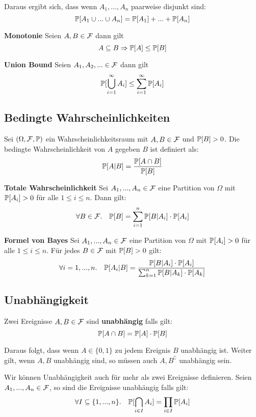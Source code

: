 Daraus ergibt sich, dass wenn $A_1, ..., A_n$ paarweise disjunkt sind: 
$$\mathbb{P}[A_1 \cup ... \cup A_n] = \mathbb{P}[A_1] + ... + \mathbb{P}[A_n]$$

\begin{mainbox}{\textbf{Monotonie}}
Seien $A, B \in \mathcal{F}$ dann gilt 
$$A \subseteq B \Rightarrow \mathbb{P}[A] \leq \mathbb{P}[B]$$
\end{mainbox}

\begin{mainbox}{\textbf{Union Bound}} Seien $A_1, A_2, ... \in \mathcal{F}$ dann gilt 
$$\mathbb{P}[\bigcup_{i = 1}^\infty A_i] \leq \sum_{i = 1}^\infty \mathbb{P}[A_i]$$
\end{mainbox}


\subsection{Bedingte Wahrscheinlichkeiten}

Sei $(\Omega, \mathcal{F}, \mathbb{P})$ ein Wahrscheinlichkeitsraum mit $A, B \in \mathcal{F}$ und $\mathbb{P}[B] > 0$. Die bedingte Wahrscheinlichkeit von $A$ gegeben $B$ ist definiert als:
$$\mathbb{P}[A | B] = \frac{\mathbb{P}[A \cap B]}{\mathbb{P}[B]}$$

\begin{mainbox}{\textbf{Totale Wahrscheinlichkeit}} Sei $A_1, ..., A_n \in \mathcal{F}$ eine Partition von $\Omega$ mit $\mathbb{P}[A_i] > 0$ für alle $1 \leq i \leq n$. Dann gilt:
$$\forall B \in \mathcal{F}. \quad \mathbb{P}[B] = \sum_{i = 1}^n \mathbb{P}[B | A_i] \cdot \mathbb{P}[A_i]$$
\end{mainbox}

\begin{mainbox}{\textbf{Formel von Bayes}} Sei $A_1, ..., A_n \in \mathcal{F}$ eine Partition von $\Omega$ mit $\mathbb{P}[A_i] > 0$ für alle $1 \leq i \leq n$. Für jedes $B \in \mathcal{F}$ mit $\mathbb{P}[B] > 0$ gilt:
$$\forall i = 1,...,n. \quad \mathbb{P}[A_i | B] = \frac{\mathbb{P}[B | A_i] \cdot \mathbb{P}[A_i]}{\sum_{k = 1}^n \mathbb{P}[B | A_k] \cdot \mathbb{P}[A_k]}$$
\end{mainbox}


\subsection{Unabhängigkeit }

\begin{mainbox}{}
    Zwei Ereignisse $A, B \in \mathcal{F}$ sind \textbf{unabhängig} falls gilt:
    $$\mathbb{P}[A \cap B] = \mathbb{P}[A] \cdot \mathbb{P}[B]$$
\end{mainbox}

Daraus folgt, dass wenn $A \in \{0, 1\}$ zu jedem Ereignis $B$ unabhängig ist. Weiter gilt, wenn $A, B$ unabhängig sind, so müssen auch $A, B^\complement$ unabhängig sein. \medskip

Wir können Unabhängigkeit auch für mehr als zwei Ereignisse definieren. Seien $A_1, ..., A_n \in \mathcal{F}$, so sind die Ereignisse unabhängig falls gilt:
$$\forall I \subseteq \{1, ..., n\}. \quad \mathbb{P}[\bigcap_{i \in I} A_i] = \prod_{i \in I} \mathbb{P}[A_i]$$

\columnbreak